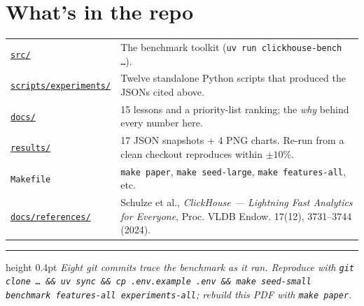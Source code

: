 \documentclass[11pt]{article}
\begin{document}
\section*{What's in the repo}

\noindent
\begin{tabularx}{\linewidth}{@{}l X@{}}
\href{run:src/}{\texttt{src/}}     & The benchmark toolkit (\texttt{uv run clickhouse-bench …}).\\
\href{run:scripts/experiments/}{\texttt{scripts/experiments/}}
                                   & Twelve standalone Python scripts that produced the JSONs cited above.\\
\href{run:docs/}{\texttt{docs/}}   & 15 lessons and a priority-list ranking; the \emph{why} behind every number here.\\
\href{run:results/}{\texttt{results/}}
                                   & 17 JSON snapshots + 4 PNG charts. Re-run from a clean checkout reproduces within $\pm 10\%$.\\
\texttt{Makefile}                  & \texttt{make paper}, \texttt{make seed-large}, \texttt{make features-all}, etc.\\
\href{run:docs/references/clickhouse-vldb-2024.pdf}{\texttt{docs/references/}}
                                   & Schulze et al., \emph{ClickHouse — Lightning Fast Analytics for Everyone},
                                     Proc. VLDB Endow. 17(12), 3731--3744 (2024).\\
\end{tabularx}

\medskip
\hrule height 0.4pt
\medskip
\noindent
\textit{Eight git commits trace the benchmark as it ran. Reproduce with
\texttt{git clone … \&\& uv sync \&\& cp .env.example .env \&\& make
seed-small benchmark features-all experiments-all}; rebuild this PDF
with \texttt{make paper}.}
\end{document}
